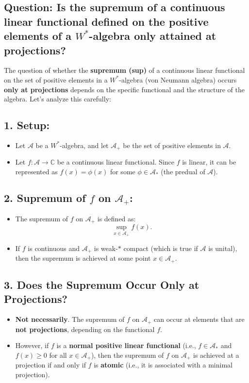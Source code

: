 \documentclass{article}
\begin{document}
\begin{itemize}
\section*{Question: Is the supremum of a continuous linear functional defined on the positive elements of a \( W^* \)-algebra only attained at projections?}

The question of whether the \textbf{supremum (sup)} of a continuous linear functional on the set of positive elements in a \( W^* \)-algebra (von Neumann algebra) occurs \textbf{only at projections} depends on the specific functional and the structure of the algebra. Let's analyze this carefully:

\subsection*{1. Setup:}
\begin{itemize}
    \item Let \( \mathcal{A} \) be a \( W^* \)-algebra, and let \( \mathcal{A}_+ \) be the set of positive elements in \( \mathcal{A} \).
    \item Let \( f: \mathcal{A} \to \mathbb{C} \) be a continuous linear functional. Since \( f \) is linear, it can be represented as \( f(x) = \phi(x) \) for some \( \phi \in \mathcal{A}_* \) (the predual of \( \mathcal{A} \)).
\end{itemize}

\subsection*{2. Supremum of \( f \) on \( \mathcal{A}_+ \):}
\begin{itemize}
    \item The supremum of \( f \) on \( \mathcal{A}_+ \) is defined as:
    \[
    \sup_{x \in \mathcal{A}_+} f(x).
    \]
    \item If \( f \) is continuous and \( \mathcal{A}_+ \) is weak-\( * \) compact (which is true if \( \mathcal{A} \) is unital), then the supremum is achieved at some point \( x \in \mathcal{A}_+ \).
\end{itemize}

\subsection*{3. Does the Supremum Occur Only at Projections?}
\begin{itemize}
    \item \textbf{Not necessarily}. The supremum of \( f \) on \( \mathcal{A}_+ \) can occur at elements that are \textbf{not projections}, depending on the functional \( f \).
    \item However, if \( f \) is a \textbf{normal positive linear functional} (i.e., \( f \in \mathcal{A}_* \) and \( f(x) \geq 0 \) for all \( x \in \mathcal{A}_+ \)), then the supremum of \( f \) on \( \mathcal{A}_+ \) is achieved at a projection if and only if \( f \) is \textbf{atomic} (i.e., it is associated with a minimal projection).
\end{itemize}


\end{itemize}
\end{document}
